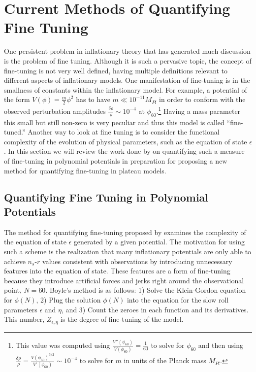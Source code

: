 \documentclass[a4paper,11pt]{article}
\def\nsr{$n_s$-$r$ }
\begin{document}
\FloatBarrier
\newpage
\section{Current Methods of Quantifying Fine Tuning}
\label{sec:Latham}

One persistent problem in inflationary theory that has generated much discussion is the problem of fine tuning. Although it is such a pervasive topic, the concept of fine-tuning is not very well defined, having multiple definitions relevant to different aspects of inflationary models. One manifestation of fine-tuning is in the smallness of constants within the inflationary model. For example, a potential of the form $V(\phi)=\tfrac{m}{2}\phi^2$ has to have $m \ll 10^{-11} M_{Pl}$ in order to conform with the observed perturbation amplitudes $\tfrac{\delta \rho}{\rho}\sim 10^{-4}$ at $\phi_{60}$.\footnote{This value was computed using $\tfrac{V''(\phi_{60})}{V(\phi_{60})}=\tfrac{1}{60}$ to solve for $\phi_{60}$ and then using $\tfrac{\delta\rho}{\rho}=\tfrac{V(\phi_{60})^{3/2}}{V'(\phi_{60})}\sim10^{-4}$ to solve for $m$ in units of the Planck mass $M_{Pl}$.} Having a mass parameter this small but still non-zero is very peculiar and thus this model is called ``fine-tuned.'' Another way to look at fine tuning is to consider the functional complexity of the evolution of physical parameters, such as the equation of state $\epsilon$. In this section we will review the work done by \citet{Boyle+2006} on quantifying such a measure of fine-tuning in polynomial potentials in preparation for proposing a new method for quantifying fine-tuning in plateau models. 

\subsection{Quantifying Fine Tuning in Polynomial Potentials}

The method for quantifying fine-tuning proposed by \citet{Boyle+2006} examines the complexity of the equation of state $\epsilon$ generated by a given potential. The motivation for using such a scheme is the realization that many inflationary potentials are only able to achieve \nsr values consistent with observations by introducing unnecessary features into the equation of state. These features are a form of fine-tuning because they introduce artificial forces and jerks right around the observational point, $N=60$. Boyle's method is as follows: 1) Solve the Klein-Gordon equation for $\phi(N)$, 2) Plug the solution $\phi(N)$ into the equation for the slow roll parameters $\epsilon$ and $\eta$, and 3) Count the zeroes in each function and its derivatives. This number, $Z_{\epsilon,\eta}$ is the degree of fine-tuning of the model. 
\end{document}
